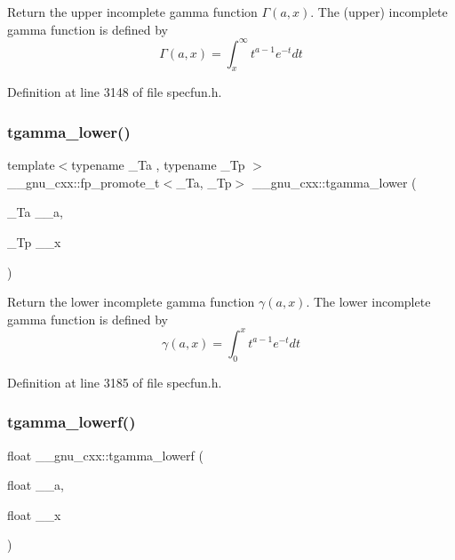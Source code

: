 Return the upper incomplete gamma function $ \Gamma(a,x) $. The (upper) incomplete gamma function is defined by \[ \Gamma(a,x) = \int_x^\infty t^{a-1}e^{-t}dt \] 

Definition at line 3148 of file specfun.\+h.

\mbox{\label{group__gnu__math__spec__func_gaed107908dec8865ea48e7764f7ea88a2}} 
\subsubsection{\texorpdfstring{tgamma\+\_\+lower()}{tgamma\_lower()}}
{\footnotesize\ttfamily template$<$typename \+\_\+\+Ta , typename \+\_\+\+Tp $>$ \\
\+\_\+\+\_\+gnu\+\_\+cxx\+::fp\+\_\+promote\+\_\+t$<$\+\_\+\+Ta, \+\_\+\+Tp$>$ \+\_\+\+\_\+gnu\+\_\+cxx\+::tgamma\+\_\+lower (\begin{DoxyParamCaption}\item[{\+\_\+\+Ta}]{\+\_\+\+\_\+a,  }\item[{\+\_\+\+Tp}]{\+\_\+\+\_\+x }\end{DoxyParamCaption})\hspace{0.3cm}{\ttfamily [inline]}}

Return the lower incomplete gamma function $ \gamma(a,x) $. The lower incomplete gamma function is defined by \[ \gamma(a,x) = \int_0^x t^{a-1}e^{-t}dt \] 

Definition at line 3185 of file specfun.\+h.

\mbox{\label{group__gnu__math__spec__func_ga8f2aabeaa29d21b19c43972efb26798c}} 
\subsubsection{\texorpdfstring{tgamma\+\_\+lowerf()}{tgamma\_lowerf()}}
{\footnotesize\ttfamily float \+\_\+\+\_\+gnu\+\_\+cxx\+::tgamma\+\_\+lowerf (\begin{DoxyParamCaption}\item[{float}]{\+\_\+\+\_\+a,  }\item[{float}]{\+\_\+\+\_\+x }\end{DoxyParamCaption})\hspace{0.3cm}{\ttfamily [inline]}}

